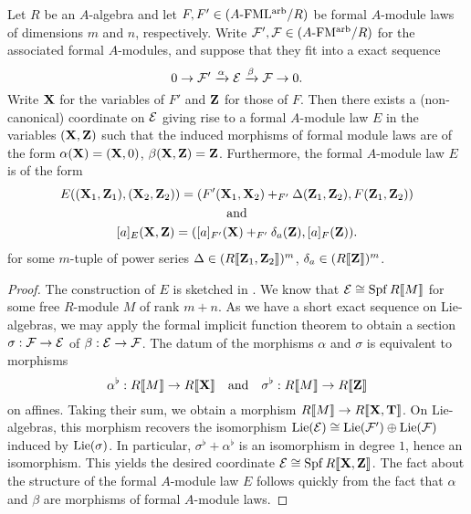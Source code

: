 \documentclass[../main.tex]{subfiles}
\begin{document}
\begin{lem}\label{lem:SESStandardForm}
  Let $R$ be an $A$-algebra and let $F, F' \in {({A}\text-\allowbreak\mathrm{FML^{arb}}/{R})}$ be 
  formal $A$-module laws of dimensions $m$ and $n$, respectively. Write 
  $\mathcal{F}', \mathcal{F} \in {({A}\text-\allowbreak\mathrm{FM^{arb}}/{R})}$ for the associated formal $A$-modules,
  and suppose that they fit into a exact sequence
  \begin{equation*}
    0 \to \mathcal{F}' \xrightarrow{\alpha} \mathcal{E} \xrightarrow{\beta} \mathcal{F} \to 0.
  \end{equation*}
  Write $\mathbf{X}$ for the variables of $F'$ and $\mathbf{Z}$ for those of $F$. Then 
  there exists a (non-canonical) coordinate on $\mathcal{E}$ giving rise to a formal
  $A$-module law $E$ in the variables $(\mathbf{X}, \mathbf{Z})$ such that the induced morphisms
  of formal module laws are of the form 
  $\alpha(\mathbf{X}) = (\mathbf{X}, 0)$, $\beta(\mathbf{X}, \mathbf{Z}) = \mathbf{Z}$. Furthermore, 
  the formal $A$-module law $E$ is of the form
  \begin{equation}\label{eq:SESStandardFormModuleLaw}
  \begin{gathered}
    E((\mathbf{X}_1, \mathbf{Z}_1), (\mathbf{X}_2, \mathbf{Z}_2)) = (F'(\mathbf{X}_1, \mathbf{X}_2) +_{F'} \Delta(\mathbf{Z}_1,
    \mathbf{Z}_2) , F(\mathbf{Z}_1, \mathbf{Z}_2)) \\
    \text{and} \\
    [a]_E(\mathbf{X}, \mathbf{Z}) = ([a]_{F'}(\mathbf{X}) +_{F'} \delta_a(\mathbf{Z}), [a]_F(\mathbf{Z})).
  \end{gathered}
  \end{equation}
  for some $m$-tuple of power series $\Delta \in (R\llbracket \mathbf{Z}_1, \mathbf{Z}_2 \rrbracket)^m$,
  $\delta_a \in (R\llbracket \mathbf{Z} \rrbracket)^m$. 
\begin{proof}
  The construction of $E$ is sketched in \cite[Proposition
  6.5]{hopkins1994equivariant}. We know that $\mathcal{E} \cong \operatorname{Spf} R\llbracket M \rrbracket$ 
  for some free $R$-module $M$ of rank $m+n$. As we have a short 
  exact sequence on Lie-algebras, we may apply the formal implicit function
  theorem  to obtain a section 
  $\sigma: \mathcal{F} \to \mathcal{E}$ of $\beta:\mathcal{E} \to \mathcal{F}$. 
  The datum of the morphisms $\alpha$ and $\sigma$ is equivalent to 
  morphisms
  \begin{equation*}
    \alpha^\flat: R \llbracket M \rrbracket \to R \llbracket \mathbf{X} \rrbracket \quad \text{and} \quad
    \sigma^\flat: R \llbracket M \rrbracket \to R \llbracket \mathbf{Z} \rrbracket
  \end{equation*}
  on affines. Taking their sum, we obtain a morphism $R \llbracket M \rrbracket
  \to R\llbracket \mathbf{X}, \mathbf{T} \rrbracket$. On Lie-algebras, this morphism recovers the
  isomorphism $\operatorname{Lie}(\mathcal{E}) \cong \operatorname{Lie}(\mathcal{F}') \oplus \operatorname{Lie}(\mathcal{F})$ induced by 
  $\operatorname{Lie}(\sigma)$. In particular, $\sigma^\flat + \alpha^\flat$ is an isomorphism
  in degree $1$, hence an isomorphism. This yields the desired
  coordinate $\mathcal{E} \cong \operatorname{Spf} R\llbracket \mathbf{X}, \mathbf{Z}\rrbracket$. The fact about the 
  structure of the formal $A$-module law $E$ follows quickly from the fact that 
  $\alpha$ and $\beta$ are morphisms of formal $A$-module laws. 
\end{proof}
\end{lem}
\end{document}
